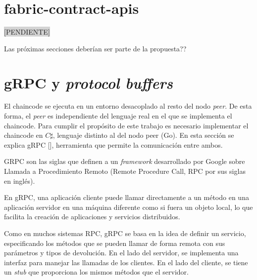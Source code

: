 %
%

\section{fabric-contract-apis}
\colorbox{lightgray}{[PENDIENTE]}


Las próximas secciones deberían ser parte de la propuesta??
\section{gRPC y \textit{protocol buffers}}

El chaincode se ejecuta en un entorno desacoplado al resto del nodo \textit{peer}. De esta forma, el \textit{peer} es independiente del lenguaje real en el que se implementa el chaincode. Para cumplir el propósito de este trabajo es necesario implementar el chaincode en $ C\sharp$, lenguaje distinto al del nodo peer (Go). En esta sección se explica gRPC [\cite{grpc-doc}], herramienta que permite la comunicación entre ambos. 

GRPC son las siglas que definen a un \textit{framework} desarrollado por Google sobre Llamada a Procedimiento Remoto (Remote Procedure Call, RPC por sus siglas en inglés).

En gRPC, una aplicación cliente puede llamar directamente a un método en una aplicación servidor en una máquina diferente como si fuera un objeto local, lo que facilita la creación de aplicaciones y servicios distribuidos. 

Como en muchos sistemas RPC, gRPC se basa en la idea de definir un servicio, especificando los métodos que se pueden llamar de forma remota con sus parámetros y tipos de devolución. En el lado del servidor, se implementa una interfaz para manejar las llamadas de los clientes. En el lado del cliente, se tiene un \textit{stub} que proporciona los mismos métodos que el servidor.

